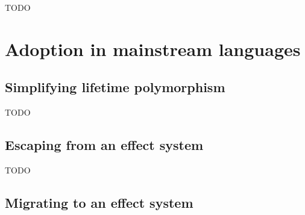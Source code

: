 \documentclass[acmsmall]{acmart}
\begin{document}

TODO %



%







\section{Adoption in mainstream languages} \label{sec:mainstream}


\subsection{Simplifying lifetime polymorphism} \label{subsec:lifetime-elision}


TODO %

\subsection{Escaping from an effect system}




TODO %

\subsection{Migrating to an effect system}
\end{document}
